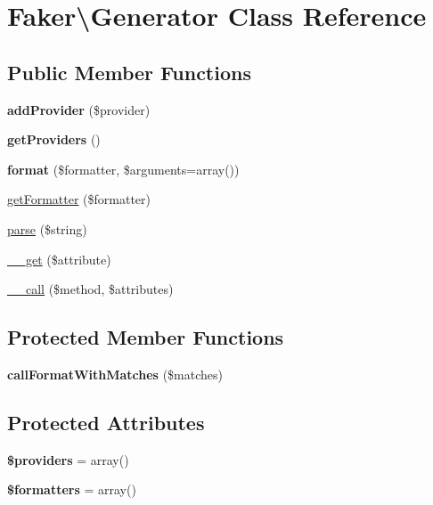 \hypertarget{classFaker_1_1Generator}{}\section{Faker\textbackslash{}Generator Class Reference}
\label{classFaker_1_1Generator}
\subsection*{Public Member Functions}
\begin{DoxyCompactItemize}
\item 
\mbox{\label{classFaker_1_1Generator_a7e6c5fd4053b6e78b9ca28dfbfab3966}} 
{\bfseries add\+Provider} (\$provider)
\item 
\mbox{\label{classFaker_1_1Generator_a27e1507d90018984e40fa34f6b744a75}} 
{\bfseries get\+Providers} ()
\item 
\mbox{\label{classFaker_1_1Generator_a79eb6bb6e45d4c10e73a8daecbedb30e}} 
{\bfseries format} (\$formatter, \$arguments=array())
\item 
\hyperlink{classFaker_1_1Generator_a13fcdc32bea33cdc2a6befa9b4519de4}{get\+Formatter} (\$formatter)
\item 
\hyperlink{classFaker_1_1Generator_a546a92d05f70fe8716c5948a67fd276f}{parse} (\$string)
\item 
\hyperlink{classFaker_1_1Generator_aae756582311926f4d61ad376038fa85f}{\+\_\+\+\_\+get} (\$attribute)
\item 
\hyperlink{classFaker_1_1Generator_aa717daf0edbda2f413ab8dd1045a722e}{\+\_\+\+\_\+call} (\$method, \$attributes)
\end{DoxyCompactItemize}
\subsection*{Protected Member Functions}
\begin{DoxyCompactItemize}
\item 
\mbox{\label{classFaker_1_1Generator_afbde496805f567bfc58f00753fe3b8bb}} 
{\bfseries call\+Format\+With\+Matches} (\$matches)
\end{DoxyCompactItemize}
\subsection*{Protected Attributes}
\begin{DoxyCompactItemize}
\item 
\mbox{\label{classFaker_1_1Generator_a0129c2f5d5a9f0ec56ffa2f34f8c441b}} 
{\bfseries \$providers} = array()
\item 
\mbox{\label{classFaker_1_1Generator_acc25fb560a2732d22ca081ac414e5907}} 
{\bfseries \$formatters} = array()
\end{DoxyCompactItemize}


